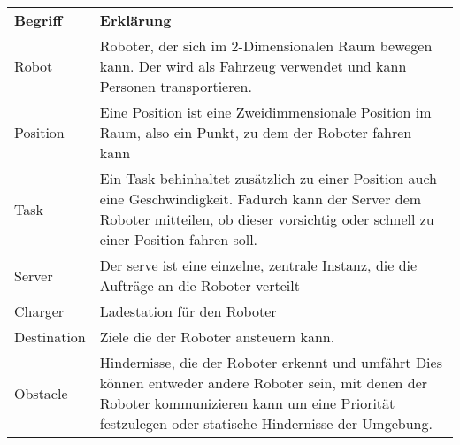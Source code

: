 	\begin{tabular}{ l p{10cm} }
		\textbf{Begriff} & \textbf{Erklärung}\\
		Robot & Roboter, der sich im 2-Dimensionalen Raum bewegen kann. Der wird
		als Fahrzeug verwendet und kann Personen transportieren.\\
		Position & Eine Position ist eine Zweidimmensionale Position im Raum,
		also ein Punkt, zu dem der Roboter fahren kann\\
		Task & Ein Task behinhaltet zusätzlich zu einer Position auch eine
		Geschwindigkeit. Fadurch kann der Server dem Roboter mitteilen, ob
		dieser vorsichtig oder schnell zu einer Position fahren
		soll.\\
		Server & Der serve ist eine einzelne, zentrale Instanz, die die Aufträge
		an die Roboter verteilt\\
		Charger & Ladestation für den Roboter\\
		Destination & Ziele die der Roboter ansteuern kann.\\
		Obstacle & Hindernisse, die der Roboter erkennt und umfährt Dies können
		entweder andere Roboter sein, mit denen der Roboter kommunizieren kann
		um eine Priorität festzulegen oder statische Hindernisse der
		Umgebung.\\
	\end{tabular}